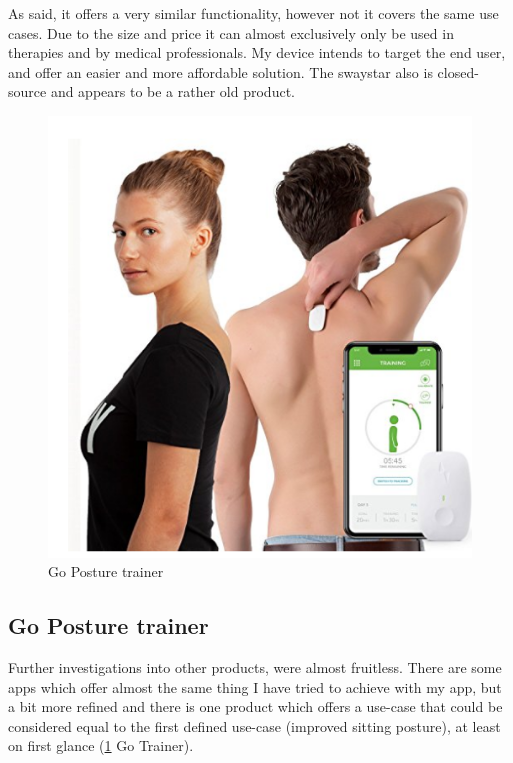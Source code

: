 As said, it offers a very similar functionality, however not it covers the same use cases. Due to the size and price it can almost exclusively only be used in therapies and by medical professionals. My device intends to target the end user, and offer an easier and more affordable solution. The swaystar also is closed-source and appears to be a rather old product.
\cite{SwayStar47:online}

\newpage

\begin{figure}
  \begin{center}
  \vspace{-20pt}
\includegraphics[width=\linewidth]{images/Screenshot_3.png}
  \end{center}
  \vspace{-10pt}
  \caption{Go Posture trainer}
  \label{fig:gotrainer}
  \vspace{-10pt}
\end{figure}

\subsection{Go Posture trainer}

Further investigations into other products, were almost fruitless. There are some apps which offer almost the same thing I have tried to achieve with my app, but a bit more refined and there is one product which offers a use-case that could be considered equal to the first defined use-case (improved sitting posture), at least on first glance (\ref{fig:gotrainer} Go Trainer). 

